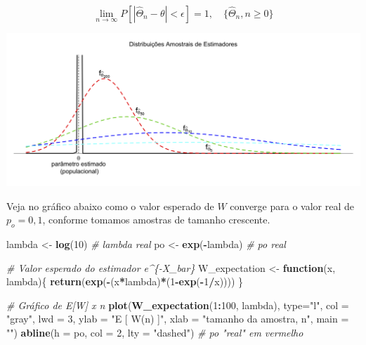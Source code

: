 \documentclass[
]{book}
\newenvironment{Shaded}{\begin{snugshade}}{\end{snugshade}}
\newcommand{\CommentTok}[1]{\textcolor[rgb]{0.56,0.35,0.01}{\textit{#1}}}
\newcommand{\ControlFlowTok}[1]{\textcolor[rgb]{0.13,0.29,0.53}{\textbf{#1}}}
\newcommand{\DataTypeTok}[1]{\textcolor[rgb]{0.13,0.29,0.53}{#1}}
\newcommand{\DecValTok}[1]{\textcolor[rgb]{0.00,0.00,0.81}{#1}}
\newcommand{\KeywordTok}[1]{\textcolor[rgb]{0.13,0.29,0.53}{\textbf{#1}}}
\newcommand{\NormalTok}[1]{#1}
\newcommand{\OperatorTok}[1]{\textcolor[rgb]{0.81,0.36,0.00}{\textbf{#1}}}
\newcommand{\StringTok}[1]{\textcolor[rgb]{0.31,0.60,0.02}{#1}}
\theoremstyle{definition}
\theoremstyle{definition}
\theoremstyle{definition}
\theoremstyle{remark}
\begin{document}
\[\underset{n\rightarrow \infty}{\lim} P[|\hat{\Theta}_n -\theta| < \epsilon] = 1,  \quad \{\hat\Theta_n , n\geq0\}\]

\includegraphics[width=1\linewidth]{img/consistent-estimator}

Veja no gráfico abaixo como o valor esperado de \(W\) converge para o valor real de \(p_o = 0,1\), conforme tomamos amostras de tamanho crescente.

\begin{Shaded}
\begin{Highlighting}[]
\NormalTok{lambda <-}\StringTok{ }\KeywordTok{log}\NormalTok{(}\DecValTok{10}\NormalTok{)  }\CommentTok{# lambda real}
\NormalTok{po <-}\StringTok{ }\KeywordTok{exp}\NormalTok{(}\OperatorTok{-}\NormalTok{lambda) }\CommentTok{# po real}

\CommentTok{# Valor esperado do estimador e^\{-X_bar\}}
\NormalTok{W_expectation <-}\StringTok{ }\ControlFlowTok{function}\NormalTok{(x, lambda)\{ }
  \KeywordTok{return}\NormalTok{(}\KeywordTok{exp}\NormalTok{(}\OperatorTok{-}\NormalTok{(x}\OperatorTok{*}\NormalTok{lambda)}\OperatorTok{*}\NormalTok{(}\DecValTok{1}\OperatorTok{-}\KeywordTok{exp}\NormalTok{(}\OperatorTok{-}\DecValTok{1}\OperatorTok{/}\NormalTok{x))))}
\NormalTok{  \}}

\CommentTok{# Gráfico de E[W] x n}
\KeywordTok{plot}\NormalTok{(}\KeywordTok{W_expectation}\NormalTok{(}\DecValTok{1}\OperatorTok{:}\DecValTok{100}\NormalTok{, lambda), }\DataTypeTok{type=}\StringTok{"l"}\NormalTok{,}
     \DataTypeTok{col =} \StringTok{"gray"}\NormalTok{, }\DataTypeTok{lwd =} \DecValTok{3}\NormalTok{,}
     \DataTypeTok{ylab =} \StringTok{"E [ W(n) ]"}\NormalTok{,}
     \DataTypeTok{xlab =} \StringTok{"tamanho da amostra, n"}\NormalTok{,}
     \DataTypeTok{main =} \StringTok{""}\NormalTok{)}
\KeywordTok{abline}\NormalTok{(}\DataTypeTok{h =}\NormalTok{ po, }\DataTypeTok{col =} \DecValTok{2}\NormalTok{, }\DataTypeTok{lty =} \StringTok{"dashed"}\NormalTok{)   }\CommentTok{# po "real" em  vermelho}
\end{Highlighting}
\end{Shaded}
\end{document}
